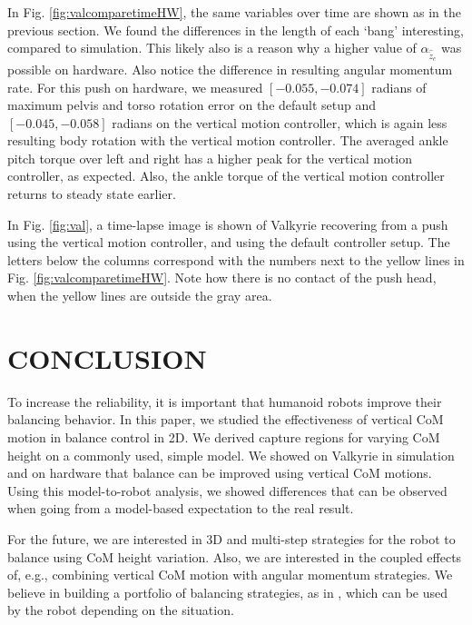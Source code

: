 \documentclass[letterpaper, 10 pt, conference]{ieeeconf}  %
\begin{document}
In Fig. \ref{fig:valcomparetimeHW}, the same variables over time are shown as in the previous section. 
We found the differences in the length of each `bang' interesting, compared to simulation. This likely also is a reason why a higher value of $\alpha_{\hat{\ddot{z}}_{c}}$ was possible on hardware. Also notice the difference in resulting angular momentum rate. For this push on hardware, we measured $[-0.055,-0.074]$ radians of maximum pelvis and torso rotation error on the default setup and $[-0.045,-0.058]$ radians on the vertical motion controller, which is again less resulting body rotation with the vertical motion controller. The averaged ankle pitch torque over left and right has a higher peak for the vertical motion controller, as expected. Also, the ankle torque of the vertical motion controller returns to steady state earlier.

In Fig. \ref{fig:val}, a time-lapse image is shown of Valkyrie recovering from a push using the vertical motion controller, and using the default controller setup. The letters below the columns correspond with the numbers next to the yellow lines in Fig. \ref{fig:valcomparetimeHW}. Note how there is no contact of the push head, when the yellow lines are outside the gray area.

\section{CONCLUSION}\label{sec:conclusion}
To increase the reliability, it is important that humanoid robots improve their balancing behavior. In this paper, we studied the effectiveness of vertical CoM motion in balance control in 2D. We derived capture regions for varying CoM height on a commonly used, simple model. We showed on Valkyrie in simulation and on hardware that balance can be improved using vertical CoM motions. Using this model-to-robot analysis, we showed differences that can be observed when going from a model-based expectation to the real result. 

For the future, we are interested in 3D and multi-step strategies for the robot to balance using CoM height variation. Also, we are interested in the coupled effects of, e.g., combining vertical CoM motion with angular momentum strategies. We believe in building a portfolio of balancing strategies, as in \cite{griffin2017walking}, which can be used by the robot depending on the situation.


\addtolength{\textheight}{-0cm}   %




\end{document}
